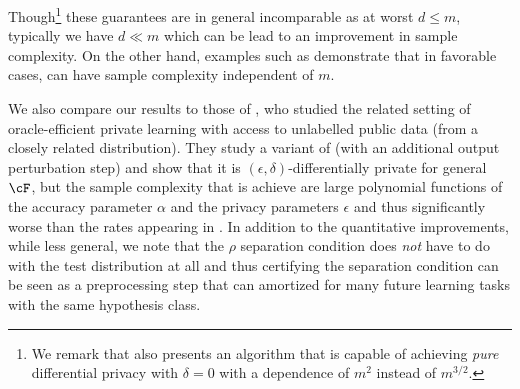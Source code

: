     Though\footnote{We remark that \citet{Neel0VW20} also presents an algorithm that is capable of achieving \emph{pure} differential privacy with $\delta = 0$ with a dependence of $m^2$ instead of $m^{3/2}$.}  these guarantees are in general incomparable as at worst $d \leq m$, typically we have $d \ll m$ which can be lead to an improvement in sample complexity.   On the other hand, examples such as  demonstrate that in favorable cases,  can have sample complexity independent of $m$.  

    We also compare our results to those of \citet{block2023oracle}, who studied the related setting of oracle-efficient private learning with access to unlabelled public data (from a closely related distribution).
    They study a variant of  (with an additional output perturbation step) and show that it is $(\epsilon, \delta)$-differentially private for general $\cF$, but the sample complexity that is achieve are large polynomial functions of the accuracy parameter $\alpha$ and the privacy parameters $\epsilon$ and thus significantly worse than the rates appearing in .   In addition to the quantitative improvements, while less general, we note that the $\rho$ separation condition does \emph{not} have to do with the test distribution at all and thus certifying the separation condition can be seen as a preprocessing step that can amortized for many future learning tasks with the same hypothesis class.



    















